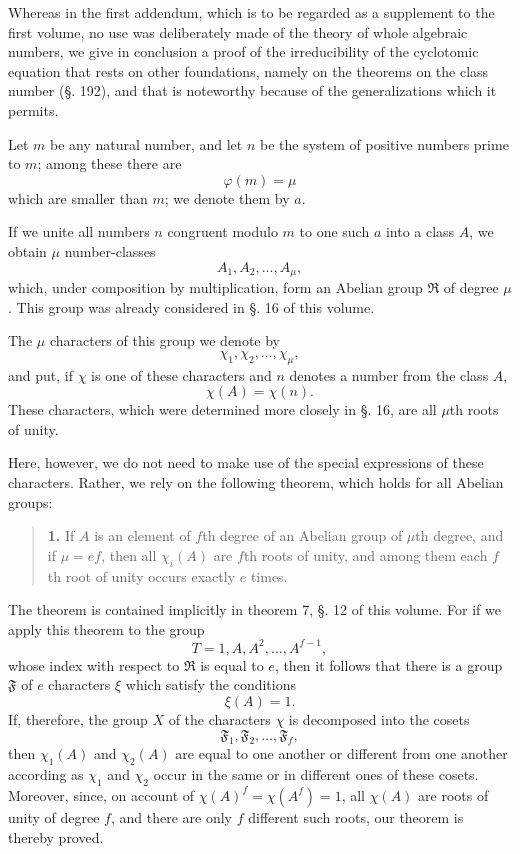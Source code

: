 \documentclass[11pt]{article}
\begin{document}
Whereas in the first addendum, which is to be regarded as a supplement to the first volume, no use was deliberately made of the theory of whole algebraic numbers, we give in conclusion a proof of the irreducibility of the cyclotomic equation that rests on other foundations, namely on the theorems on the class number (§. 192), and that is noteworthy because of the generalizations which it permits.

Let $m$ be any natural number, and let $n$ be the system of positive numbers prime to $m$; among these there are
\begin{equation}\tag{1}
\varphi(m)=\mu
\end{equation}
which are smaller than $m$; we denote them by $a$.

If we unite all numbers $n$ congruent modulo $m$ to one such $a$ into a class $A$, we obtain $\mu$ number-classes
\begin{equation}\tag{2}
A_1,A_2,\ldots,A_\mu,
\end{equation}
which, under composition by multiplication, form an Abelian group $\mathfrak R$ of degree $\mu$. This group was already considered in §. 16 of this volume.

The $\mu$ characters of this group we denote by
\begin{equation}\tag{3}
\chi_1,\chi_2,\ldots,\chi_\mu,
\end{equation}
and put, if $\chi$ is one of these characters and $n$ denotes a number from the class $A$,
\begin{equation}\tag{4}
\chi(A)=\chi(n).
\end{equation}
These characters, which were determined more closely in §. 16, are all $\mu$th roots of unity.

Here, however, we do not need to make use of the special expressions of these characters. Rather, we rely on the following theorem, which holds for all Abelian groups:

\begin{quote}
\textbf{1.} If $A$ is an element of $f$th degree of an Abelian group of $\mu$th degree, and if $\mu=ef$, then all $\chi_i(A)$ are $f$th roots of unity, and among them each $f$th root of unity occurs exactly $e$ times.
\end{quote}

The theorem is contained implicitly in theorem 7, §. 12 of this volume. For if we apply this theorem to the group
\[
T=1,A,A^2,\ldots,A^{f-1},
\]
whose index with respect to $\mathfrak R$ is equal to $e$, then it follows that there is a group $\mathfrak F$ of $e$ characters $\xi$ which satisfy the conditions
\[
\xi(A)=1.
\]
If, therefore, the group $X$ of the characters $\chi$ is decomposed into the cosets
\[
\mathfrak F_1,\mathfrak F_2,\ldots,\mathfrak F_f,
\]
then $\chi_1(A)$ and $\chi_2(A)$ are equal to one another or different from one another according as $\chi_1$ and $\chi_2$ occur in the same or in different ones of these cosets. Moreover, since, on account of $\chi(A)^f=\chi(A^f)=1$, all $\chi(A)$ are roots of unity of degree $f$, and there are only $f$ different such roots, our theorem is thereby proved.
\end{document}

